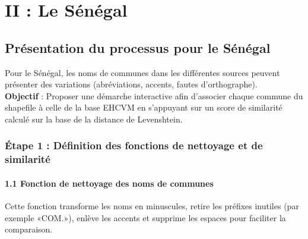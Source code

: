 \documentclass[
]{article}
\begin{document}
\hypertarget{ii-le-suxe9nuxe9gal}{%
\section{II : Le Sénégal}\label{ii-le-suxe9nuxe9gal}}

\hypertarget{pruxe9sentation-du-processus-pour-le-suxe9nuxe9gal}{%
\subsection{Présentation du processus pour le
Sénégal}\label{pruxe9sentation-du-processus-pour-le-suxe9nuxe9gal}}

Pour le Sénégal, les noms de communes dans les différentes sources
peuvent présenter des variations (abréviations, accents, fautes
d'orthographe).\\
\textbf{Objectif} : Proposer une démarche interactive afin d'associer
chaque commune du shapefile à celle de la base EHCVM en s'appuyant sur
un score de similarité calculé sur la base de la distance de
Levenshtein.

\hypertarget{uxe9tape-1-duxe9finition-des-fonctions-de-nettoyage-et-de-similarituxe9}{%
\subsubsection{Étape 1 : Définition des fonctions de nettoyage et de
similarité}\label{uxe9tape-1-duxe9finition-des-fonctions-de-nettoyage-et-de-similarituxe9}}

\hypertarget{fonction-de-nettoyage-des-noms-de-communes}{%
\paragraph{1.1 Fonction de nettoyage des noms de
communes}\label{fonction-de-nettoyage-des-noms-de-communes}}

Cette fonction transforme les noms en minuscules, retire les préfixes
inutiles (par exemple «COM.»), enlève les accents et supprime les
espaces pour faciliter la comparaison.
\end{document}
